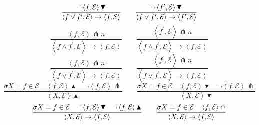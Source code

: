 \begin{equation*}
\frac{\lnot \left\langle f,\mathcal{E}\right\rangle \blacktriangledown }{%
\left\langle f\vee f^{\prime },\mathcal{E}\right\rangle \rightarrow
\left\langle f,\mathcal{E}\right\rangle }\qquad \frac{\lnot \left\langle
f^{\prime },\mathcal{E}\right\rangle \blacktriangledown }{\left\langle f\vee
f^{\prime },\mathcal{E}\right\rangle \rightarrow \left\langle f^{\prime },%
\mathcal{E}\right\rangle }
\end{equation*}%
\begin{equation*}
\frac{\left\langle f,\mathcal{E}\right\rangle \pitchfork n}{\left\langle
f\wedge f^{\prime },\mathcal{E}\right\rangle \rightarrow \left\langle f,%
\mathcal{E}\right\rangle }\qquad \frac{\left\langle f^{\prime },\mathcal{E}%
\right\rangle \pitchfork n}{\left\langle f\wedge f^{\prime },\mathcal{E}%
\right\rangle \rightarrow \left\langle f,\mathcal{E}\right\rangle }
\end{equation*}%
\begin{equation*}
\frac{\left\langle f,\mathcal{E}\right\rangle \pitchfork n}{\left\langle
f\vee f^{\prime },\mathcal{E}\right\rangle \rightarrow \left\langle f,%
\mathcal{E}\right\rangle }\qquad \frac{\left\langle f^{\prime },\mathcal{E}%
\right\rangle \pitchfork n}{\left\langle f\vee f^{\prime },\mathcal{E}%
\right\rangle \rightarrow \left\langle f,\mathcal{E}\right\rangle }
\end{equation*}%
\begin{equation*}
\frac{\sigma X=f\in \mathcal{E}\quad \left\langle f,\mathcal{E}\right\rangle
\blacktriangle \quad \lnot \left\langle f,\mathcal{E}\right\rangle
\pitchfork }{\left\langle X,\mathcal{E}\right\rangle \blacktriangle }\qquad 
\frac{\sigma X=f\in \mathcal{E}\quad \left\langle f,\mathcal{E}\right\rangle
\blacktriangledown \quad \lnot \left\langle f,\mathcal{E}\right\rangle
\pitchfork }{\left\langle X,\mathcal{E}\right\rangle \blacktriangledown }
\end{equation*}%
\begin{equation*}
\frac{\sigma X=f\in \mathcal{E}\quad \lnot \left\langle f,\mathcal{E}%
\right\rangle \blacktriangledown \quad \lnot \left\langle f,\mathcal{E}%
\right\rangle \blacktriangle }{\left\langle X,\mathcal{E}\right\rangle
\rightarrow \left\langle f,\mathcal{E}\right\rangle }\qquad \frac{\sigma
X=f\in \mathcal{E}\quad \left\langle f,\mathcal{E}\right\rangle \pitchfork }{%
\left\langle X,\mathcal{E}\right\rangle \rightarrow \left\langle f,\mathcal{E%
}\right\rangle }
\end{equation*}%
